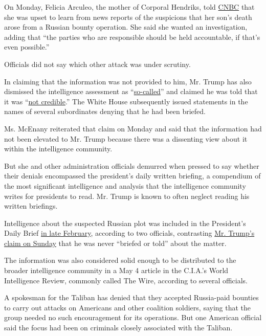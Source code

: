 On Monday, Felicia Arculeo, the mother of Corporal Hendriks, told
\href{https://www.cnbc.com/2020/06/29/mom-of-marine-killed-in-afghanistan-wants-russia-bounty-claim-investigated.html?__source=twitter\%7Cmain}{CNBC}
that she was upset to learn from news reports of the suspicions that her
son's death arose from a Russian bounty operation. She said she wanted
an investigation, adding that ``the parties who are responsible should
be held accountable, if that's even possible.''

Officials did not say which other attack was under scrutiny.

In claiming that the information was not provided to him, Mr. Trump has
also dismissed the intelligence assessment as
``\href{https://twitter.com/realdonaldtrump/status/1277202159109537793?lang=en}{so-called}''
and claimed he was told that it was
``\href{https://twitter.com/realdonaldtrump/status/1277431695248183298?lang=en}{not
credible}.'' The White House subsequently issued statements in the names
of several subordinates denying that he had been briefed.

Ms. McEnany reiterated that claim on Monday and said that the
information had not been elevated to Mr. Trump because there was a
dissenting view about it within the intelligence community.

But she and other administration officials demurred when pressed to say
whether their denials encompassed the president's daily written
briefing, a compendium of the most significant intelligence and analysis
that the intelligence community writes for presidents to read. Mr. Trump
is known to often neglect reading his written briefings.

Intelligence about the suspected Russian plot was included in the
President's Daily Brief
\href{https://www.nytimes.com/2020/06/29/us/politics/russian-bounty-trump.html}{in
late February}, according to two officials, contrasting
\href{https://twitter.com/realDonaldTrump/status/1277202159109537793}{Mr.
Trump's claim on Sunday} that he was never ``briefed or told'' about the
matter.

The information was also considered solid enough to be distributed to
the broader intelligence community in a May 4 article in the C.I.A.'s
World Intelligence Review, commonly called The Wire, according to
several officials.

A spokesman for the Taliban has denied that they accepted Russia-paid
bounties to carry out attacks on Americans and other coalition soldiers,
saying that the group needed no such encouragement for its operations.
But one American official said the focus had been on criminals closely
associated with the Taliban.

